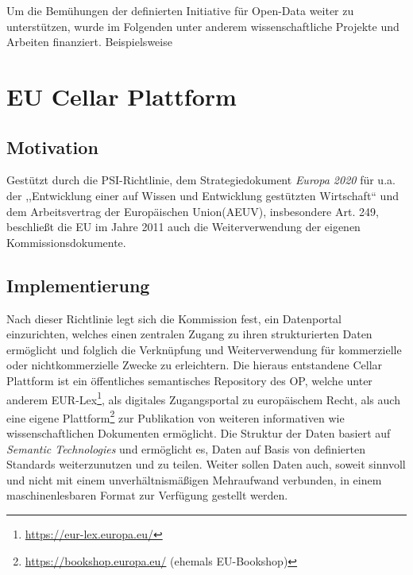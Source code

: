 Um die Bemühungen der definierten Initiative für Open-Data weiter zu unterstützen, wurde im Folgenden unter anderem wissenschaftliche Projekte und Arbeiten finanziert.
Beispielsweise 



        
        \pagebreak
        \section{EU Cellar Plattform}

        \subsection{Motivation}
        
Gestützt durch die PSI-Richtlinie, dem Strategiedokument \textit{Europa 2020} für u.a. der ,,Entwicklung einer auf Wissen und Entwicklung gestützten Wirtschaft`` und dem Arbeitsvertrag der Europäischen Union(AEUV), insbesondere Art. 249, beschließt die EU im Jahre 2011 auch die Weiterverwendung der eigenen Kommissionsdokumente. \cite[ErwG. 1]{2011D0833}

        \subsection{Implementierung}

Nach dieser Richtlinie legt sich die Kommission fest, ein Datenportal einzurichten, welches einen zentralen Zugang zu ihren strukturierten Daten ermöglicht und folglich die Verknüpfung und Weiterverwendung für kommerzielle oder nichtkommerzielle Zwecke zu erleichtern. \cite[Art. 5]{2011D0833}
Die hieraus entstandene Cellar Plattform ist ein öffentliches semantisches Repository des \ac{OP}, welche unter anderem EUR-Lex\footnote{\href{https://eur-lex.europa.eu/homepage.html?locale=de}{https://eur-lex.europa.eu/}}, als digitales Zugangsportal zu europäischem Recht, als auch eine eigene Plattform\footnote{\href{https://bookshop.europa.eu/}{https://bookshop.europa.eu/} (ehemals EU-Bookshop)} zur Publikation von weiteren informativen wie wissenschaftlichen Dokumenten ermöglicht.
Die Struktur der Daten basiert auf \textit{Semantic Technologies} und ermöglicht es, Daten auf Basis von definierten Standards weiterzunutzen und zu teilen. \cite[5]{eu_cellar}
Weiter sollen Daten auch, soweit sinnvoll und nicht mit einem unverhältnismäßigen Mehraufwand verbunden, in einem maschinenlesbaren Format zur Verfügung gestellt werden. \cite[Art. 8 Abs. 1f]{2011D0833}

